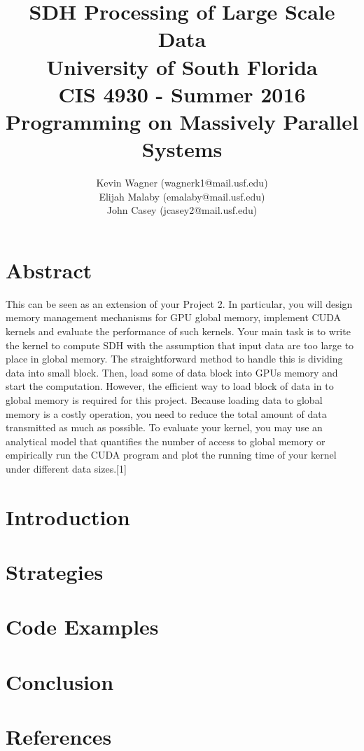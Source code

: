 \documentclass{article}
\title{SDH Processing of Large Scale Data\\University of South Florida\\CIS 4930 - Summer 2016\\Programming on Massively Parallel Systems
}
\author{Kevin Wagner (wagnerk1@mail.usf.edu)\\
		Elijah Malaby (emalaby@mail.usf.edu)\\
		John Casey (jcasey2@mail.usf.edu)}
\begin{document}
  \maketitle
  \newpage
  \tableofcontents
  \newpage

\section{\textbf{Abstract}}
	This can be seen as an extension of your Project 2. In particular, you will design memory management mechanisms for GPU global memory, implement CUDA kernels and evaluate the performance of such kernels. Your main task is to write the kernel to compute SDH with the assumption that input data are too large to place in global memory. The straightforward method to handle this is dividing data into small block. Then, load some of data block into GPUs memory and start the computation. However, the efficient way to load block of data in to global memory is required for this project. Because loading data to global memory is a costly operation, you need to reduce the total amount of data transmitted as much as possible. To evaluate your kernel, you may use an analytical model that quantifies the number of access to global memory or empirically run the CUDA program and plot the running time of your kernel under different data sizes.[1]
	
\section{\textbf{Introduction}}
\section{\textbf{Strategies}}
\section{\textbf{Code Examples}}
\section{\textbf{Conclusion}}
\section{\textbf{References}}
\end{document}
